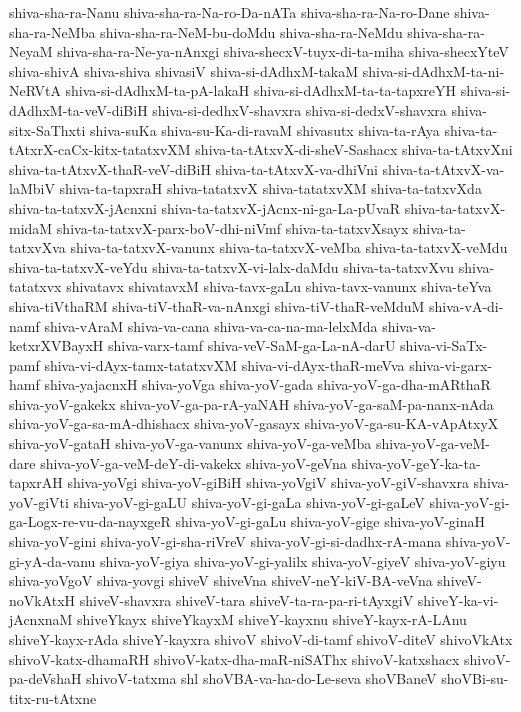 {shiva-sha-ra-Nanu
shiva-sha-ra-Na-ro-Da-nATa
shiva-sha-ra-Na-ro-Dane
shiva-sha-ra-NeMba
shiva-sha-ra-NeM-bu-doMdu
shiva-sha-ra-NeMdu
shiva-sha-ra-NeyaM
shiva-sha-ra-Ne-ya-nAnxgi
shiva-shecxV-tuyx-di-ta-miha
shiva-shecxYteV
shiva-shivA
shiva-shiva
shivasiV
shiva-si-dAdhxM-takaM
shiva-si-dAdhxM-ta-ni-NeRVtA
shiva-si-dAdhxM-ta-pA-lakaH
shiva-si-dAdhxM-ta-ta-tapxreYH
shiva-si-dAdhxM-ta-veV-diBiH
shiva-si-dedhxV-shavxra
shiva-si-dedxV-shavxra
shiva-sitx-SaThxti
shiva-suKa
shiva-su-Ka-di-ravaM
shivasutx
shiva-ta-rAya
shiva-ta-tAtxrX-caCx-kitx-tatatxvXM
shiva-ta-tAtxvX-di-sheV-Sashacx
shiva-ta-tAtxvXni
shiva-ta-tAtxvX-thaR-veV-diBiH
shiva-ta-tAtxvX-va-dhiVni
shiva-ta-tAtxvX-va-laMbiV
shiva-ta-tapxraH
shiva-tatatxvX
shiva-tatatxvXM
shiva-ta-tatxvXda
shiva-ta-tatxvX-jAcnxni
shiva-ta-tatxvX-jAcnx-ni-ga-La-pUvaR
shiva-ta-tatxvX-midaM
shiva-ta-tatxvX-parx-boV-dhi-niVmf
shiva-ta-tatxvXsayx
shiva-ta-tatxvXva
shiva-ta-tatxvX-vanunx
shiva-ta-tatxvX-veMba
shiva-ta-tatxvX-veMdu
shiva-ta-tatxvX-veYdu
shiva-ta-tatxvX-vi-lalx-daMdu
shiva-ta-tatxvXvu
shiva-tatatxvx
shivatavx
shivatavxM
shiva-tavx-gaLu
shiva-tavx-vanunx
shiva-teYva
shiva-tiVthaRM
shiva-tiV-thaR-va-nAnxgi
shiva-tiV-thaR-veMduM
shiva-vA-di-namf
shiva-vAraM
shiva-va-cana
shiva-va-ca-na-ma-lelxMda
shiva-va-ketxrXVBayxH
shiva-varx-tamf
shiva-veV-SaM-ga-La-nA-darU
shiva-vi-SaTx-pamf
shiva-vi-dAyx-tamx-tatatxvXM
shiva-vi-dAyx-thaR-meVva
shiva-vi-garx-hamf
shiva-yajacnxH
shiva-yoVga
shiva-yoV-gada
shiva-yoV-ga-dha-mARthaR
shiva-yoV-gakekx
shiva-yoV-ga-pa-rA-yaNAH
shiva-yoV-ga-saM-pa-nanx-nAda
shiva-yoV-ga-sa-mA-dhishacx
shiva-yoV-gasayx
shiva-yoV-ga-su-KA-vApAtxyX
shiva-yoV-gataH
shiva-yoV-ga-vanunx
shiva-yoV-ga-veMba
shiva-yoV-ga-veM-dare
shiva-yoV-ga-veM-deY-di-vakekx
shiva-yoV-geVna
shiva-yoV-geY-ka-ta-tapxrAH
shiva-yoVgi
shiva-yoV-giBiH
shiva-yoVgiV
shiva-yoV-giV-shavxra
shiva-yoV-giVti
shiva-yoV-gi-gaLU
shiva-yoV-gi-gaLa
shiva-yoV-gi-gaLeV
shiva-yoV-gi-ga-Logx-re-vu-da-nayxgeR
shiva-yoV-gi-gaLu
shiva-yoV-gige
shiva-yoV-ginaH
shiva-yoV-gini
shiva-yoV-gi-sha-riVreV
shiva-yoV-gi-si-dadhx-rA-mana
shiva-yoV-gi-yA-da-vanu
shiva-yoV-giya
shiva-yoV-gi-yalilx
shiva-yoV-giyeV
shiva-yoV-giyu
shiva-yoVgoV
shiva-yovgi
shiveV
shiveVna
shiveV-neY-kiV-BA-veVna
shiveV-noVkAtxH
shiveV-shavxra
shiveV-tara
shiveV-ta-ra-pa-ri-tAyxgiV
shiveY-ka-vi-jAcnxnaM
shiveYkayx
shiveYkayxM
shiveY-kayxnu
shiveY-kayx-rA-LAnu
shiveY-kayx-rAda
shiveY-kayxra
shivoV
shivoV-di-tamf
shivoV-diteV
shivoVkAtx
shivoV-katx-dhamaRH
shivoV-katx-dha-maR-niSAThx
shivoV-katxshacx
shivoV-pa-deVshaH
shivoV-tatxma
shl
shoVBA-va-ha-do-Le-seva
shoVBaneV
shoVBi-su-titx-ru-tAtxne
}
